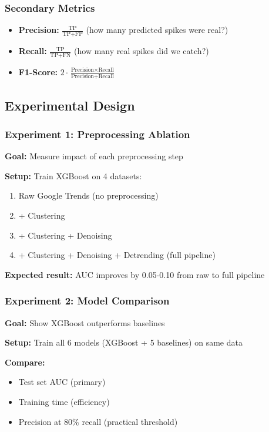 \documentclass[12pt,a4paper]{article}
\begin{document}
\subsubsection{Secondary Metrics}

\begin{itemize}
    \item \textbf{Precision:} $\frac{\text{TP}}{\text{TP} + \text{FP}}$ (how many predicted spikes were real?)
    \item \textbf{Recall:} $\frac{\text{TP}}{\text{TP} + \text{FN}}$ (how many real spikes did we catch?)
    \item \textbf{F1-Score:} $2 \cdot \frac{\text{Precision} \times \text{Recall}}{\text{Precision} + \text{Recall}}$
\end{itemize}

\subsection{Experimental Design}

\subsubsection{Experiment 1: Preprocessing Ablation}

\textbf{Goal:} Measure impact of each preprocessing step

\textbf{Setup:} Train XGBoost on 4 datasets:
\begin{enumerate}
    \item Raw Google Trends (no preprocessing)
    \item + Clustering
    \item + Clustering + Denoising
    \item + Clustering + Denoising + Detrending (full pipeline)
\end{enumerate}

\textbf{Expected result:} AUC improves by 0.05-0.10 from raw to full pipeline

\subsubsection{Experiment 2: Model Comparison}

\textbf{Goal:} Show XGBoost outperforms baselines

\textbf{Setup:} Train all 6 models (XGBoost + 5 baselines) on same data

\textbf{Compare:}
\begin{itemize}
    \item Test set AUC (primary)
    \item Training time (efficiency)
    \item Precision at 80\% recall (practical threshold)
\end{itemize}
\end{document}
